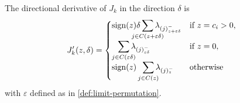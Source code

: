 \begin{theorem}\label{thm:sl1-directional-derivative}
  The directional derivative of \(J_k\) in the direction \(\delta\) is
  \[
    J'_k(z, \delta) =
    \begin{cases}
      \sign(z)\delta\smashoperator{\sum_{j \in C(z + \varepsilon \delta)}}
      \lambda_{(j)^-_{z + \varepsilon\delta}}                      & \text{if } z = c_i > 0, \\
      \smashoperator[r]{\sum_{j \in C(\varepsilon \delta)}}
      \lambda_{(j)^-_{\varepsilon\delta}}                          & \text{if } z = 0,       \\
      \sign(z)\smashoperator[r]{\sum_{j \in C(z)}} \lambda_{(j)^-_z} & \text{otherwise}
    \end{cases}
  \]
  with \(\varepsilon\) defined as in \cref{def:limit-permutation}.
\end{theorem}
